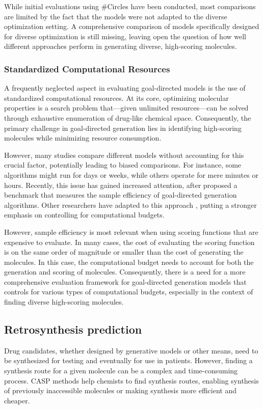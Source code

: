 While initial evaluations using \#Circles have been conducted, most comparisons are limited by the
fact that the models were not adapted to the diverse optimization setting. A comprehensive
comparison of models specifically designed for diverse optimization is still missing, leaving open
the question of how well different approaches perform in generating diverse, high-scoring molecules.

\subsubsection{Standardized Computational Resources}
A frequently neglected aspect in evaluating goal-directed models is the use of standardized
computational resources. At its core, optimizing molecular properties is a search problem
that—given unlimited resources—can be solved through exhaustive enumeration of drug-like chemical space.
Consequently, the primary challenge in goal-directed generation lies in identifying high-scoring molecules
while minimizing resource consumption.

However, many studies compare different models without accounting for this crucial factor,
potentially leading to biased comparisons. For instance, some algorithms might run for days or
weeks, while others operate for mere minutes or hours. Recently, this issue has gained increased
attention, after \citep{gaoSampleEfficiencyMatters2022} proposed a benchmark that measures
the sample efficiency of goal-directed generation algorithms. Other researchers have adapted to this approach
\citep{thomasReevaluatingSampleEfficiency2022,thomasAugmentedHillClimbIncreases2022,guoAugmentedMemoryCapitalizing2023},
putting a stronger emphasis on controlling for computational budgets.

However, sample efficiency is most relevant when using scoring functions that are expensive to
evaluate. In many cases, the cost of evaluating the scoring function is on the same order of
magnitude or smaller than the cost of generating the molecules. In this case, the computational
budget needs to account for both the generation and scoring of molecules. Consequently, there is a
need for a more comprehensive evaluation framework for goal-directed generation models that controls
for various types of computational budgets, especially in the context of finding diverse high-scoring
molecules.

\subsection{Retrosynthesis prediction}
Drug candidates, whether designed by generative models or other means, need to be
synthesized for testing and eventually for use in patients. However, finding a synthesis route for a
given molecule can be a complex and time-consuming process. \Ac{CASP} methods help
chemists to find synthesis routes, enabling synthesis of previously inaccessible molecules or making
synthesis more efficient and cheaper.

